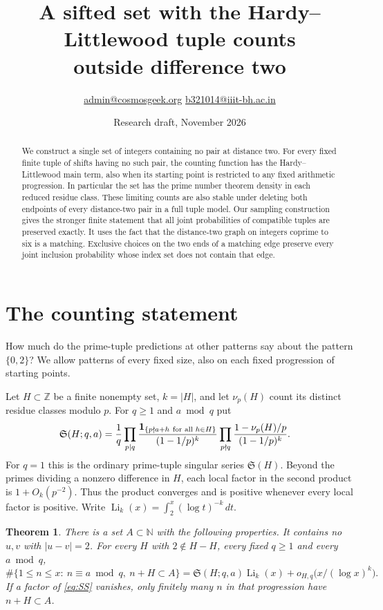 \documentclass[11pt]{article}
\title{\vspace*{-.6in}A sifted set with the Hardy--Littlewood tuple counts\\ outside difference two}
\author{\small\href{mailto:admin@cosmosgeek.org}{admin@cosmosgeek.org}
  \qquad\href{mailto:b321014@iiit-bh.ac.in}{b321014@iiit-bh.ac.in}}
\date{Research draft, November 2026}
\newtheorem{theorem}{Theorem}
\newcommand{\SSer}{\mathfrak S}
\newcommand{\one}{\mathbf 1}
\newcommand{\LiK}{\operatorname{Li}}
\begin{document}
\maketitle
\begin{abstract}
We construct a single set of integers containing no pair at distance two.
For every fixed finite tuple of shifts having no such pair, the counting
function has the Hardy--Littlewood main term, also when its starting
point is restricted to any fixed arithmetic progression. In particular
the set has the prime number theorem density in each reduced residue
class. These limiting counts are also stable under deleting both
endpoints of every distance-two pair in a full tuple model.
Our sampling construction gives the stronger finite statement that
all joint probabilities of compatible tuples are preserved exactly.
It uses the fact that the distance-two graph on
integers coprime to six is a matching. Exclusive choices on the two
ends of a matching edge preserve every joint inclusion probability
whose index set does not contain that edge.
\end{abstract}

\section{The counting statement}
How much do the prime-tuple predictions at other patterns say about
the pattern $\{0,2\}$? We allow patterns of every fixed size, also on
each fixed progression of starting points.

Let $H\subset\mathbb Z$ be a finite nonempty set, $k=|H|$, and let
$\nu_p(H)$ count its distinct residue classes modulo $p$. For $q\ge1$
and $a\bmod q$ put
\begin{align}
 \SSer(H;q,a)={1\over q}
 &\prod_{p\mid q}
 {\one_{\{p\nmid a+h\ \text{for all }h\in H\}}\over(1-1/p)^k}
 \prod_{p\nmid q}{1-\nu_p(H)/p\over(1-1/p)^k}.       \label{eq:SS}
\end{align}
For $q=1$ this is the ordinary prime-tuple singular series $\SSer(H)$.
Beyond the primes dividing a nonzero difference in $H$, each local
factor in the second product is $1+O_k(p^{-2})$. Thus the product
converges and is positive whenever every local factor is positive.
Write $\LiK_k(x)=\int_2^x(\log t)^{-k}\,dt$.

\begin{theorem}\label{th:main}
There is a set $A\subset\mathbb N$ with the following properties.
It contains no $u,v$ with $|u-v|=2$. For every $H$ with
$2\notin H-H$, every fixed $q\ge1$ and every $a\bmod q$,
\begin{equation}
 \#\{1\le n\le x:\ n\equiv a\bmod q,\ n+H\subset A\}
 =\SSer(H;q,a)\LiK_k(x)+o_{H,q}\bigl(x/(\log x)^k\bigr).
 \label{eq:theorem}
\end{equation}
If a factor of \eqref{eq:SS} vanishes, only finitely many $n$ in that
progression have $n+H\subset A$.
\end{theorem}
\end{document}
